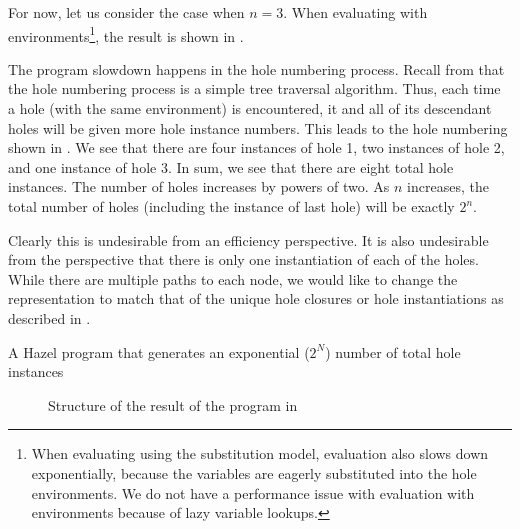For now, let us consider the case when $n=3$. When evaluating with environments\footnote{When evaluating using the substitution model, evaluation also slows down exponentially, because the variables are eagerly substituted into the hole environments. We do not have a performance issue with evaluation with environments because of lazy variable lookups.}, the result is shown in .

The program slowdown happens in the hole numbering process. Recall from  that the hole numbering process is a simple tree traversal algorithm. Thus, each time a hole (with the same environment) is encountered, it and all of its descendant holes will be given more hole instance numbers. This leads to the hole numbering shown in . We see that there are four instances of hole 1, two instances of hole 2, and one instance of hole 3. In sum, we see that there are eight total hole instances. The number of holes increases by powers of two. As $n$ increases, the total number of holes (including the instance of last hole) will be exactly $2^n$.

Clearly this is undesirable from an efficiency perspective. It is also undesirable from the perspective that there is only one instantiation of each of the holes. While there are multiple paths to each node, we would like to change the representation to match that of the unique hole closures or hole instantiations as described in .

\begin{listing}
  \centering
  \caption{A Hazel program that generates an exponential ($2^N$) number of total hole instances}
  \label{fig:hole_renumbering_problem}
\end{listing}

\begin{figure}
  \centering
  \caption{Structure of the result of the program in }
  \label{fig:hole-renumbering-solution-structure}
\end{figure}

